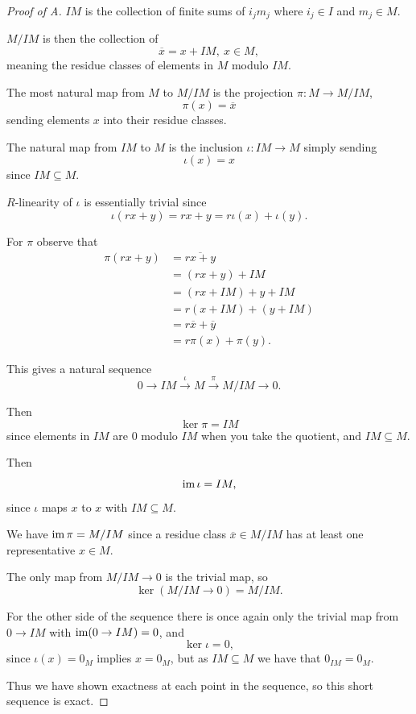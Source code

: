 \documentclass[11pt]{article}
\begin{document}
\begin{proof}[Proof of A]
    $IM$ is the collection of finite sums of 
    $i_jm_j$ where $i_j \in I$ and $m_j \in M$. 

    $M/IM$ is then the collection of 
    \[
        \overline x = x + IM, \ x \in M, 
    \]
    meaning the residue classes of elements in $M$ modulo 
    $IM$. 

    The most natural map from $M$ to $M/IM$ is the 
    projection $\pi : M \to M/IM$, 
    \[
        \pi(x) = \overline x 
    \]
    sending elements $x$ into their residue classes. 
    
    The natural map from $IM$ to $M$ is the inclusion 
    $\iota : IM \to M$ simply sending 
    \[
        \iota(x) = x
    \]
    since $IM \subseteq M$. 

    $R$-linearity of $\iota$ is essentially 
    trivial since 
    \[
        \iota(rx+y) = rx + y = r\iota(x) + \iota(y). 
    \]

    For $\pi$ observe that 
    \begin{align*}
        \pi(rx + y) 
        &= \overline{rx + y} \\ 
        &= (rx + y) + IM \\ 
        &= (rx + IM) + y + IM \\ 
        &= r(x+IM) + (y + IM) \\ 
        &= r\overline{x} + \overline y \\ 
        &= r\pi(x) + \pi(y).   
    \end{align*}

    This gives a natural sequence  
    \[
        0 \to IM \overset\iota\to M \overset\pi\to M/IM \to 0. 
    \]

    Then 
    \[
        \ker \pi = IM 
    \]
    since elements in $IM$ are $0$ modulo $IM$ 
    when you take the quotient, and 
    $IM \subseteq M$.  

    Then 
    \[
        \operatorname{im} \iota = IM,          
    \]   
    since $\iota$ maps $x$ to $x$ with $IM \subseteq M$. 
    
    We have $\operatorname{im} \pi = M/IM$ since 
    a residue class $\overline x \in M/IM$ has 
    at least one representative $x\in M$. 

    The only map from $M/IM \to 0$ is the trivial map, 
    so 
    \[
        \ker(M/IM \to 0) = M/IM. 
    \]

    For the other side of the sequence there is once 
    again only the trivial map from 
    $0 \to IM$ with $\operatorname{im}(0 \to IM) = 0$, and 
    \[
        \ker \iota = 0,  
    \] 
    since $\iota(x) = 0_M$ implies $x = 0_M$, but 
    as $IM \subseteq M$ we have that $0_{IM} = 0_M$. 

    Thus we have shown exactness 
    at each point in the sequence, so this 
    short sequence is exact.
\end{proof}
\end{document}
